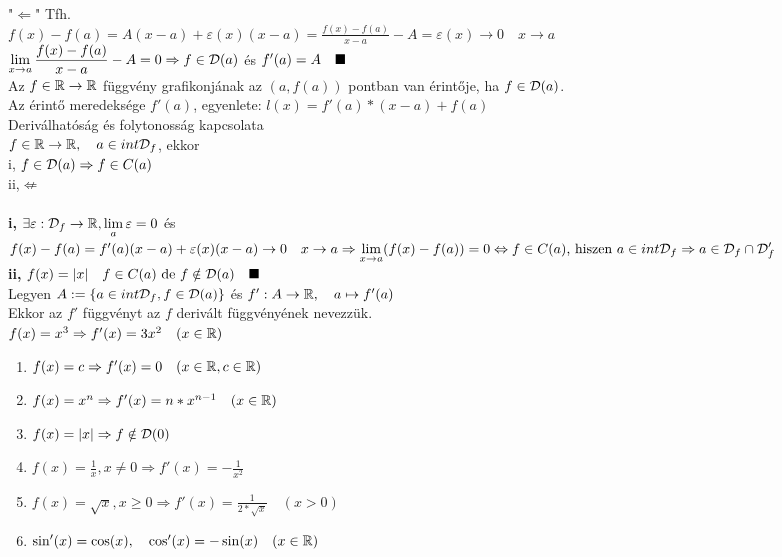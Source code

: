 \documentclass[a4paper,11pt]{article}
\begin{document}
"$\Leftarrow$" Tfh.\\[0.1cm]$f(x)-f(a)=A(x-a)+\varepsilon(x)(x-a)= \frac{f(x)-f(a)}{x-a}-A=\varepsilon(x)\to0\quad x\to a$\\[0.1cm] $\displaystyle\lim_{x\to a}\frac{f(x)-f(a)}{x-a}-A=0 \Rightarrow f\in\displaystyle\mathcal{D}(a)$ és $f'(a)=A\quad\blacksquare$\\[0.2cm] Az $f\in\displaystyle\mathbb{R}\to\mathbb{R}$ függvény grafikonjának az $(a,f(a))$ pontban van érintője, ha $f\in\displaystyle\mathcal{D}(a)$.\\[0.1cm]Az érintő meredeksége $f'(a)$, egyenlete: $l(x)=f'(a)*(x-a)+f(a)$\\[0.3cm]\tetel Deriválhatóság és folytonosság kapcsolata\\[0.1cm]$f\in\displaystyle\mathbb{R}\to\mathbb{R},\quad a\in int\displaystyle\mathcal{D}_f$, ekkor\\[0.2cm] \hspace*{1cm} i, $f\in\displaystyle\mathcal{D}(a)\Rightarrow f\in C(a)$\\[0.1cm]\hspace*{1cm} ii,\hspace{1.6cm}$\nLeftarrow$\\[0.2cm]\biz\\[0.2cm]\textbf{i,} $\exists\varepsilon: \displaystyle\mathcal{D}_f\to\mathbb{R},\displaystyle\lim_{a}\varepsilon=0$ és $f(x)-f(a)=f'(a)(x-a)+\varepsilon(x)(x-a)\to0\quad x\to a\\[0.1cm]\Rightarrow\displaystyle\lim_{x\to a}(f(x)-f(a))=0\Leftrightarrow f\in C(a)\text{, hiszen } a\in int\displaystyle\mathcal{D}_f\Rightarrow a\in\displaystyle\mathcal{D}_f\cap\displaystyle\mathcal{D}_f'$\\[0.2cm]\textbf{ii,} $f(x)=|x|\quad f\in C(a)\text{ de } f\notin\displaystyle\mathcal{D}(a)\quad\blacksquare$\\[0.2cm] Legyen $A:=\{a\in int\displaystyle\mathcal{D}_f,f\in\displaystyle\mathcal{D}(a)\}$ és $f':A\to\mathbb{R},\quad a\mapsto f'(a)$\\[0.1cm]Ekkor az $f'$ függvényt az $f$ derivált függvényének nevezzük.\\[0.1cm]\pl $f(x)=x^3\Rightarrow f'(x)=3x^2\quad(x\in\mathbb{R})$
\begin{enumerate}
	\item $f(x)=c\Rightarrow f'(x)=0\quad (x\in\mathbb{R},c\in\mathbb{R})$
	\item $f(x)=x^n\Rightarrow f'(x)=n*x^{n-1}\quad (x\in\mathbb{R})$
	\item $f(x)=|x|\Rightarrow f\notin\displaystyle\mathcal{D}(0)$
	\item $f(x)=\frac{1}{x},x\neq0\Rightarrow f'(x)=-\frac{1}{x^2}$
	\item $f(x)=\sqrt{x},x\geq0\Rightarrow f'(x)=\frac{1}{2*\sqrt{x}}\quad(x>0)$
	\item $\sin'(x)=\cos(x),\quad\cos'(x)=-\sin(x)\quad(x\in\mathbb{R})$
\end{enumerate}
\newpage
\end{document}
